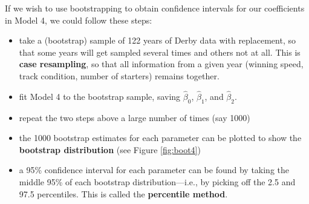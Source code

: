 \documentclass[
]{krantz}
\newenvironment{Shaded}{\begin{snugshade}}{\end{snugshade}}
\newcommand{\CommentTok}[1]{\textcolor[rgb]{0.37,0.37,0.37}{\textit{#1}}}
\newcommand{\DataTypeTok}[1]{\textcolor[rgb]{0.27,0.27,0.27}{#1}}
\newcommand{\DecValTok}[1]{\textcolor[rgb]{0.06,0.06,0.06}{#1}}
\newcommand{\FloatTok}[1]{\textcolor[rgb]{0.06,0.06,0.06}{#1}}
\newcommand{\KeywordTok}[1]{\textcolor[rgb]{0.27,0.27,0.27}{\textbf{#1}}}
\newcommand{\NormalTok}[1]{#1}
\newcommand{\OperatorTok}[1]{\textcolor[rgb]{0.43,0.43,0.43}{\textbf{#1}}}
\newcommand{\StringTok}[1]{\textcolor[rgb]{0.5,0.5,0.5}{#1}}
\providecommand{\tightlist}{%
  \setlength{\itemsep}{0pt}\setlength{\parskip}{0pt}}
\begin{document}
If we wish to use bootstrapping to obtain confidence intervals for our coefficients in Model 4, we could follow these steps:

\begin{itemize}
\tightlist
\item
  take a (bootstrap) sample of 122 years of Derby data with replacement, so that some years will get sampled several times and others not at all. This is \textbf{case resampling},  so that all information from a given year (winning speed, track condition, number of starters) remains together.
\item
  fit Model 4 to the bootstrap sample, saving \(\hat{\beta}_0\), \(\hat{\beta}_1\), and \(\hat{\beta}_2\).
\item
  repeat the two steps above a large number of times (say 1000)
\item
  the 1000 bootstrap estimates for each parameter can be plotted to show the \textbf{bootstrap distribution}  (see Figure \ref{fig:boot4})
\item
  a 95\% confidence interval for each parameter can be found by taking the middle 95\% of each bootstrap distribution---i.e., by picking off the 2.5 and 97.5 percentiles. This is called the \textbf{percentile method}. 
\end{itemize}

\begin{Shaded}
\end{Shaded}
\end{document}
